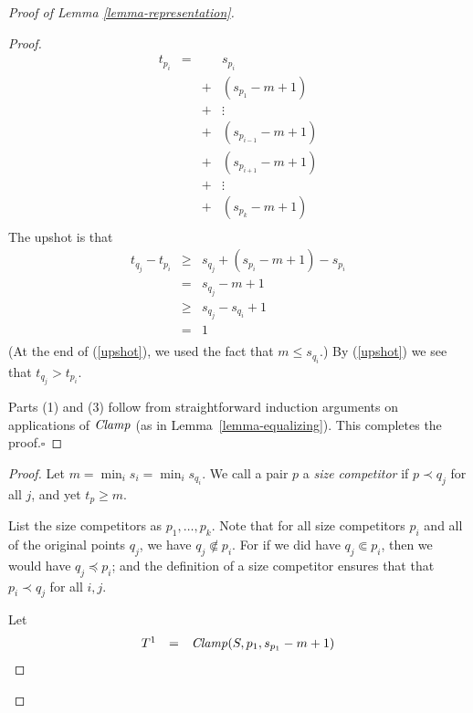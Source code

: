 \documentclass[letterpaper]{article}
\theoremstyle{definition}
\newcommand{\rem}[1]{\relax}
\newcommand{\Clamp}{\protect{\mbox{\textit{Clamp}}}}
\newcommand{\precsubseteq}{\Subset}
\begin{document}
\begin{proof}[Proof of Lemma \ref{lemma-representation}]
\begin{proof}
\begin{equation}
\label{nearendsubset}
\begin{array}{lccc}
t_{p_i} & = & & s_{p_i}\\
& & + & ( s_{p_1}-m  + 1)\\
& & + & \vdots\\
& & + & (s_{p_{i-1}} -m  + 1)\\
& & + & (s_{p_{i+1}} -m  + 1)\\
& & + & \vdots\\
& & + & (s_{p_k}-m + 1)\\
\end{array}
\end{equation}
The upshot is that
\begin{equation}\label{upshot}
\begin{array}{lcl}
t_{q_j} - t_{p_i} & \geq & s_{q_j} + (s_{p_i}-m + 1) - s_{p_i}\\
& = & s_{q_j} - m + 1\\
& \geq & s_{q_j} -s_{q_i} +1\\
& = & 1\\
\end{array}
\end{equation}
(At the end of (\ref{upshot}), we used the fact that $m \leq s_{q_i}$.)
By (\ref{upshot}) we see that $t_{q_j} > t_{p_i}$.

\rem{The reason that the first $\ge$ is not an equals sign $=$ is that it may be the case that $p_i \Subset p_{i^'}$}

Parts (1) and (3) follow from straightforward induction arguments on applications of $\Clamp$ (as in Lemma~\ref{lemma-equalizing}).
This completes the proof.\hfill$\square$
\end{proof}
\begin{proof}
Let $m =  \min_i s_{i} = \min_i s_{q_i}$.
We call a pair $p$ a \emph{size competitor} if 
$p\prec q_j$ for all $j$, and yet  $t_p \geq m$.

List the size competitors as $p_1, \ldots, p_k$. 
 Note that for all size competitors $p_i$ and all of the original points
 $q_j$,  we have $q_j \not \precsubseteq p_i$.
For if we did have $q_j \precsubseteq p_i$, then we would have 
$q_j \preceq p_i$; and the definition of a size competitor
ensures that that $p_i \prec q_j$ for all $i, j$.


 Let \[ \begin{array}{lcl}
 T^1  & = &  \Clamp(S,p_1,  s_{p_1} -m + 1)\\


\end{array}\]
\end{proof}
\end{proof}
\end{document}
